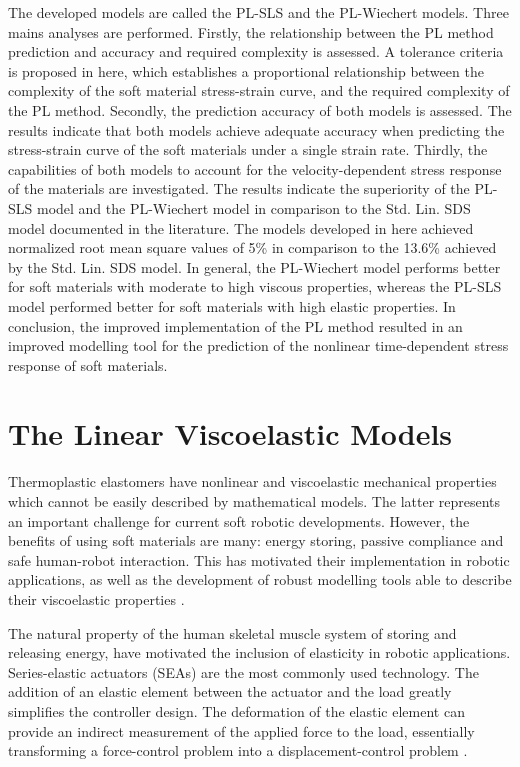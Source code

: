 The developed models are called the PL-SLS and the PL-Wiechert models. Three mains analyses are performed. Firstly, the relationship between the PL method prediction and accuracy and required complexity is assessed. A tolerance criteria is proposed in here, which establishes a proportional relationship between the complexity of the soft material stress-strain curve, and the required complexity of the PL method. Secondly, the prediction accuracy of both models is assessed. The results indicate that both models achieve adequate accuracy when predicting the stress-strain curve of the soft materials under a single strain rate. Thirdly, the capabilities of both models to account for the velocity-dependent stress response of the materials are investigated. The results indicate the superiority of the PL-SLS model and the PL-Wiechert model in comparison to the Std. Lin. SDS model documented in the literature. The models developed in here achieved normalized root mean square values of 5\% in comparison to the 13.6\% achieved by the Std. Lin. SDS model. In general, the PL-Wiechert model performs better for soft materials with moderate to high viscous properties, whereas the PL-SLS model performed better for soft materials with high elastic properties. In conclusion, the improved implementation of the PL method resulted in an improved modelling tool for the prediction of the nonlinear time-dependent stress response of soft materials.

\section{The Linear Viscoelastic Models}

Thermoplastic elastomers have nonlinear and viscoelastic mechanical properties which cannot be easily described by mathematical models. The latter represents an important challenge for current soft robotic developments. However, the benefits of using soft materials are many: energy storing, passive compliance and safe human-robot interaction. This has motivated their implementation in robotic applications, as well as the development of robust modelling tools able to describe their viscoelastic properties \cite{lee2017soft}.

The natural property of the human skeletal muscle system of storing and releasing energy, have motivated the inclusion of elasticity in robotic applications. Series-elastic actuators (SEAs) are the most commonly used technology. The addition of an elastic element between the actuator and the load greatly simplifies the controller design. The deformation of the elastic element can provide an indirect measurement of the applied force to the load, essentially transforming a force-control problem into a displacement-control problem \cite{agarwal2017series}. 

